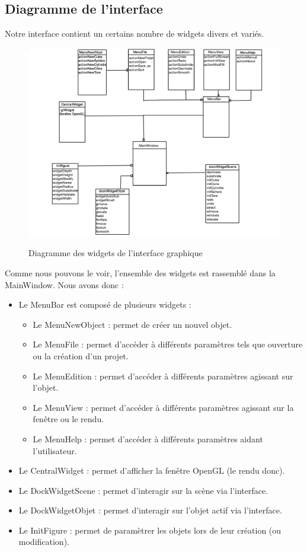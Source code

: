 \documentclass[a4paper]{memoir}
\begin{document}
			\subsection{Diagramme de l'interface}
				Notre interface contient un certains nombre de widgets divers et variés.
				\begin{figure}
					\hspace{-4cm}\includegraphics[scale=0.50]{img/diagramInterface.png}
					\label{fig:interface}
					\caption{Diagramme des widgets de l'interface graphique}
				\end{figure}
				
			        Comme nous pouvons le voir, l'ensemble des widgets est rassemblé dans la MainWindow. Nous avons donc : 
				\begin{itemize}
					\item Le MenuBar est composé de plusieurs widgets : 
					\begin{itemize}
						\item Le MenuNewObject : permet de créer un nouvel objet.
						\item Le MenuFile : permet d'accéder à différents paramètres tels que ouverture ou la création d'un projet.
						\item Le MenuEdition : permet d'accéder à différents paramètres agissant sur l'objet.
						\item Le MenuView : permet d'accéder à différents paramètres agissant sur la fenêtre ou le rendu.
						\item Le MenuHelp : permet d'accéder à différents paramètres aidant l'utilisateur.
					\end{itemize}
					\item Le CentralWidget : permet d'afficher la fenêtre OpenGL (le rendu donc).
					\item Le DockWidgetScene : permet d'interagir sur la scène via l'interface.
					\item Le DockWidgetObjet : permet d'interagir sur l'objet actif via l'interface.
					\item Le InitFigure : permet de paramètrer les objets lors de leur création (ou modification).
				\end{itemize}
				
\end{document}
